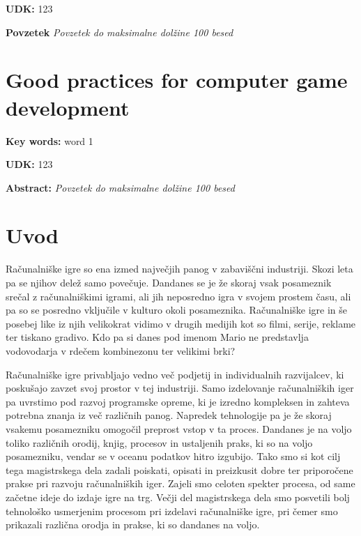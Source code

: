 \documentclass[12pt,a4paper,twoside]{book}
\begin{document}
\textbf{UDK:} 123

\textbf{Povzetek}\newline
\textit{Povzetek do maksimalne dolžine 100 besed}
\cleardoublepage

\chapter*{Good practices for computer game development}\thispagestyle{fancy}
\textbf{Key words:} word 1

\textbf{UDK:} 123

\textbf{Abstract:}\newline
\textit{Povzetek do maksimalne dolžine 100 besed}
\cleardoublepage

\tableofcontents

\listoffigures

\lstlistoflistings

\chapter{Uvod}\thispagestyle{fancy}
\setcounter{page}{1}

Računalniške igre so ena izmed največjih panog v zabaviščni industriji. Skozi leta pa se njihov delež samo povečuje. Dandanes se je že skoraj vsak posameznik srečal z računalniškimi igrami, ali jih neposredno igra v svojem prostem času, ali pa so se posredno vključile v kulturo okoli posameznika. Računalniške igre in še posebej like iz njih velikokrat vidimo v drugih medijih kot so filmi, serije, reklame ter tiskano gradivo. Kdo pa si danes pod imenom Mario ne predstavlja vodovodarja v rdečem kombinezonu ter velikimi brki?

Računalniške igre privabljajo vedno več podjetij in individualnih razvijalcev, ki poskušajo zavzet svoj prostor v tej industriji. Samo izdelovanje računalniških iger pa uvrstimo pod razvoj programske opreme, ki je izredno kompleksen in zahteva potrebna znanja iz več različnih panog. Napredek tehnologije pa je že skoraj vsakemu posamezniku omogočil preprost vstop v ta proces. Dandanes je na voljo toliko različnih orodij, knjig, procesov in ustaljenih praks, ki so na voljo posamezniku, vendar se v oceanu podatkov hitro izgubijo. Tako smo si kot cilj tega magistrskega dela zadali poiskati, opisati in preizkusit dobre ter priporočene prakse pri razvoju računalniških iger. Zajeli smo celoten spekter procesa, od same začetne ideje do izdaje igre na trg. Večji del magistrskega dela smo posvetili bolj tehnološko usmerjenim procesom pri izdelavi računalniške igre, pri čemer smo prikazali različna orodja in prakse, ki so dandanes na voljo.
\end{document}
